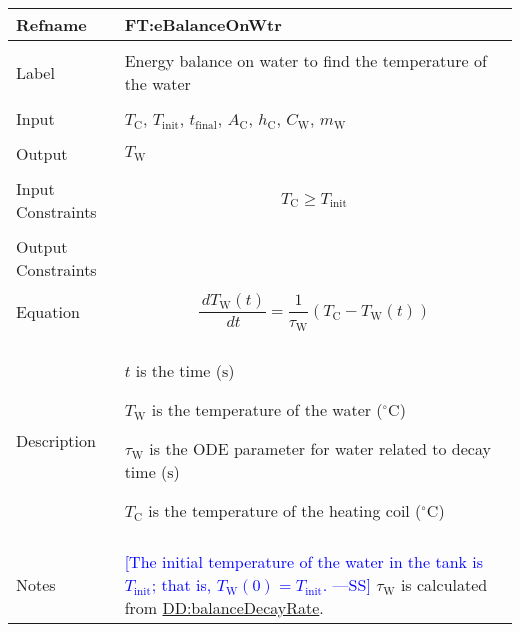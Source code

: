 \documentclass[12pt]{article}
\newcommand{\authornote}[3]{\textcolor{#1}{[#3 ---#2]}}
\newcommand{\authornote}[3]{}
\newcommand{\wss}[1]{\authornote{blue}{SS}{#1}}
\begin{document}
\vspace{\baselineskip}
\noindent
\begin{minipage}{\textwidth}
\begin{tabular}{>{\raggedright}p{}>{\raggedright\arraybackslash}p{}}
\toprule \textbf{Refname} & \textbf{FT:eBalanceOnWtr}
\label{FT:eBalanceOnWtr}
\\ \midrule \\
Label & Energy balance on water to find the temperature of the water
        
\\ \midrule \\
Input & ${T_{\text{C}}}$, ${T_{\text{init}}}$, ${t_{\text{final}}}$, ${A_{\text{C}}}$, ${h_{\text{C}}}$, ${C_{\text{W}}}$, ${m_{\text{W}}}$
        
\\ \midrule \\
Output & ${T_{\text{W}}}$
         
\\ \midrule \\
Input Constraints & \begin{displaymath}
                    {T_{\text{C}}}\geq{}{T_{\text{init}}}
                    \end{displaymath}
\\ \midrule \\
Output Constraints & 
\\ \midrule \\
Equation & \begin{displaymath}
           \frac{\,d{T_{\text{W}}}(t)}{\,dt}=\frac{1}{{τ_{\text{W}}}} \left({T_{\text{C}}}-{T_{\text{W}}}\left(t\right)\right)
           \end{displaymath}
\\ \midrule \\
Description & \begin{symbDescription}
              \item{$t$ is the time (${\text{s}}$)}
              \item{${T_{\text{W}}}$ is the temperature of the water (${{}^{\circ}\text{C}}$)}
              \item{${τ_{\text{W}}}$ is the ODE parameter for water related to decay time (${\text{s}}$)}
              \item{${T_{\text{C}}}$ is the temperature of the heating coil (${{}^{\circ}\text{C}}$)}
              \end{symbDescription}
\\ \midrule \\
Notes & \wss{The initial temperature of the water in the tank is
$T_\text{init}$;  that is, $T_\text{W}(0) = T_\text{init}$.}  ${τ_{\text{W}}}$
is calculated from \hyperref[DD:balanceDecayRate]{DD:balanceDecayRate}.
        

\end{tabular}
\end{minipage}
\end{document}
